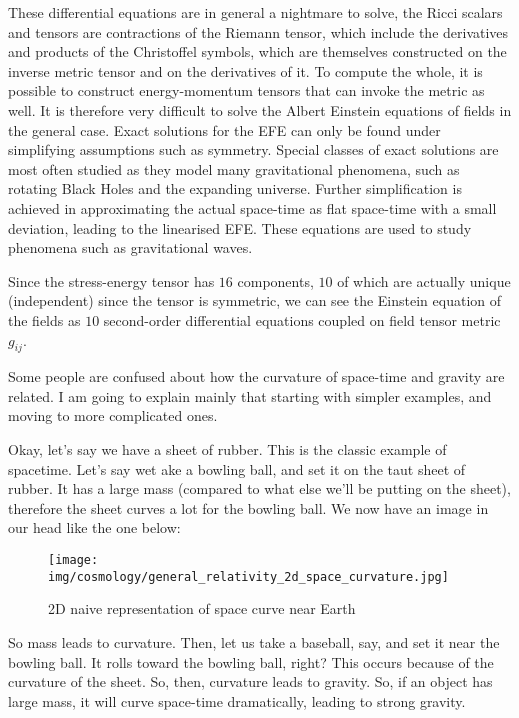 	These differential equations are in general a nightmare to solve, the Ricci scalars and tensors are contractions of the Riemann tensor, which include the derivatives and products of the Christoffel symbols, which are themselves constructed on the inverse metric tensor and on the derivatives of it. To compute the whole, it is possible to construct energy-momentum tensors that can invoke the metric as well. It is therefore very difficult to solve the Albert Einstein equations of fields in the general case. Exact solutions for the EFE can only be found under simplifying assumptions such as symmetry. Special classes of exact solutions are most often studied as they model many gravitational phenomena, such as rotating Black Holes and the expanding universe. Further simplification is achieved in approximating the actual space-time as flat space-time with a small deviation, leading to the linearised EFE. These equations are used to study phenomena such as gravitational waves.

	Since the stress-energy tensor has $16$ components, $10$ of which are actually unique (independent) since the tensor is symmetric, we can see the Einstein equation of the fields as $10$ second-order differential equations coupled on field tensor metric $g_{ij}$.
	
	Some people are confused about how the curvature of space-time and gravity are related. I am going to explain mainly that starting with simpler examples, and moving to more complicated ones.

	Okay, let's say we have a sheet of rubber. This is the classic example of spacetime. Let's say wet ake a bowling ball, and set it on the taut sheet of rubber. It has a large mass (compared to what else we'll be putting on the sheet), therefore the sheet curves a lot for the bowling ball. We now have an image in our head like the one below:
	\begin{figure}[H]
		\centering
		\texttt{[image: img/cosmology/general\_relativity\_2d\_space\_curvature.jpg]}	
		\caption{2D naive representation of space curve near Earth}
	\end{figure}
	So mass leads to curvature. Then, let us take a baseball, say, and set it near the bowling ball. It rolls toward the bowling ball, right? This occurs because of the curvature of the sheet. So, then, curvature leads to gravity. So, if an object has large mass, it will curve space-time dramatically, leading to strong gravity.

